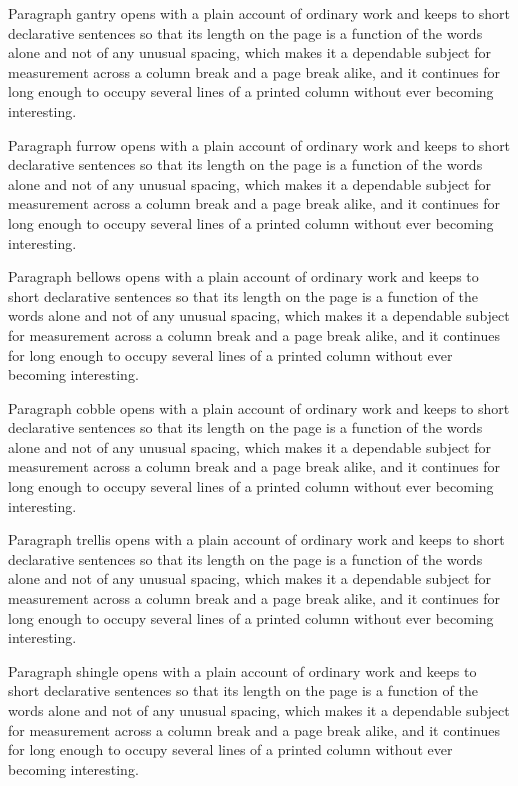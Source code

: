 \documentclass{article}
\begin{document}
Paragraph gantry opens with a plain account of ordinary work and keeps to short declarative sentences so that its length on the page is a function of the words alone and not of any unusual spacing, which makes it a dependable subject for measurement across a column break and a page break alike, and it continues for long enough to occupy several lines of a printed column without ever becoming interesting.

Paragraph furrow opens with a plain account of ordinary work and keeps to short declarative sentences so that its length on the page is a function of the words alone and not of any unusual spacing, which makes it a dependable subject for measurement across a column break and a page break alike, and it continues for long enough to occupy several lines of a printed column without ever becoming interesting.

Paragraph bellows opens with a plain account of ordinary work and keeps to short declarative sentences so that its length on the page is a function of the words alone and not of any unusual spacing, which makes it a dependable subject for measurement across a column break and a page break alike, and it continues for long enough to occupy several lines of a printed column without ever becoming interesting.

Paragraph cobble opens with a plain account of ordinary work and keeps to short declarative sentences so that its length on the page is a function of the words alone and not of any unusual spacing, which makes it a dependable subject for measurement across a column break and a page break alike, and it continues for long enough to occupy several lines of a printed column without ever becoming interesting.

Paragraph trellis opens with a plain account of ordinary work and keeps to short declarative sentences so that its length on the page is a function of the words alone and not of any unusual spacing, which makes it a dependable subject for measurement across a column break and a page break alike, and it continues for long enough to occupy several lines of a printed column without ever becoming interesting.

Paragraph shingle opens with a plain account of ordinary work and keeps to short declarative sentences so that its length on the page is a function of the words alone and not of any unusual spacing, which makes it a dependable subject for measurement across a column break and a page break alike, and it continues for long enough to occupy several lines of a printed column without ever becoming interesting.
\end{document}
